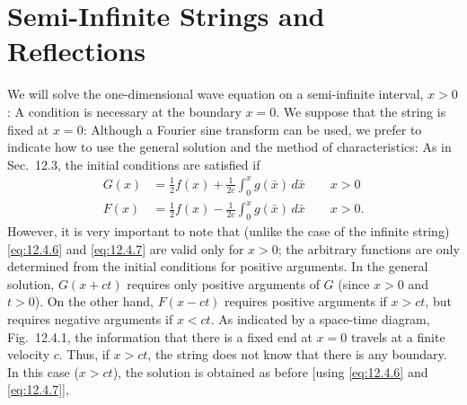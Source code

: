 \section{Semi-Infinite Strings and Reflections}
\label{sec:semi-infinite}

We will solve the one-dimensional wave equation on a semi-infinite interval, $x > 0$:
A condition is necessary at the boundary $x = 0$.  We suppose that the string is fixed at $x = 0$:
Although a Fourier sine transform can be used, we prefer to indicate how to use the general solution and the method of characteristics:
As in Sec.~12.3, the initial conditions are satisfied if
\begin{align}
\label{eq:12.4.6}
G(x) &= \frac{1}{2}f(x) + \frac{1}{2c}\int_0^x g(\bar{x})\,d\bar{x} \qquad x > 0 \\
\label{eq:12.4.7}
F(x) &= \frac{1}{2}f(x) - \frac{1}{2c}\int_0^x g(\bar{x})\,d\bar{x} \qquad x > 0.
\end{align}
However, it is very important to note that (unlike the case of the infinite string) \eqref{eq:12.4.6} and \eqref{eq:12.4.7} are valid only for $x > 0$; the arbitrary functions are only determined from the initial conditions for positive arguments.  In the general solution, $G(x + ct)$ requires only positive arguments of $G$ (since $x > 0$ and $t > 0$).  On the other hand, $F(x - ct)$ requires positive arguments if $x > ct$, but requires negative arguments if $x < ct$.  As indicated by a space-time diagram, Fig.~12.4.1, the information that there is a fixed end at $x = 0$ travels at a finite velocity $c$.  Thus, if $x > ct$, the string does not know that there is any boundary.  In this case ($x > ct$), the solution is obtained as before [using \eqref{eq:12.4.6} and \eqref{eq:12.4.7}],
